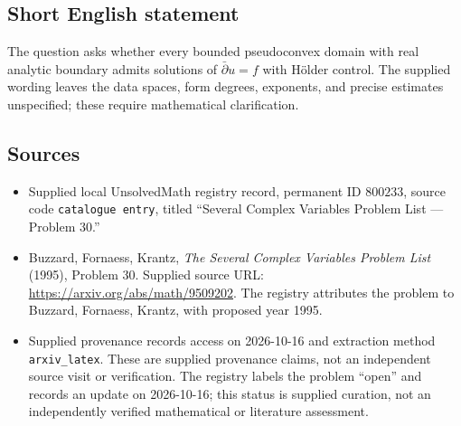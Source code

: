\documentclass[11pt]{article}
\begin{document}
\subsection{Short English statement}
The question asks whether every bounded pseudoconvex domain with real analytic boundary admits solutions of \(\bar\partial u=f\) with H\"older control. The supplied wording leaves the data spaces, form degrees, exponents, and precise estimates unspecified; these require mathematical clarification.
\subsection{Sources}
\begin{itemize}
\item Supplied local UnsolvedMath registry record, permanent ID \(800233\), source code \texttt{catalogue entry}, titled ``Several Complex Variables Problem List --- Problem 30.''
\item Buzzard, Fornaess, Krantz, \emph{The Several Complex Variables Problem List} (1995), Problem 30. Supplied source URL: \url{https://arxiv.org/abs/math/9509202}. The registry attributes the problem to Buzzard, Fornaess, Krantz, with proposed year 1995.
\item Supplied provenance records access on 2026-10-16 and extraction method \texttt{arxiv\_latex}. These are supplied provenance claims, not an independent source visit or verification. The registry labels the problem ``open'' and records an update on 2026-10-16; this status is supplied curation, not an independently verified mathematical or literature assessment.
\end{itemize}
\end{document}
